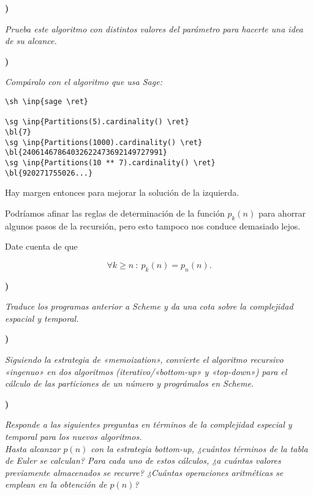 \documentclass{article}
\newcommand\ret{↵\ } %
\newcommand\inp[1]{\colorbox{gray!40}{#1}} %
\newcounter{pregunta}
\newcommand\prop[1]%
{\addtocounter{pregunta}{1}
\noindent%
{\color{naranja_muy}\small\bf\thepregunta)}
\parbox[t]{.95\linewidth}{\it #1}}
\newcommand\cod{./scripts}
\def\sh{{\color{naranja_muy}\texttt{\$}}\hspace{-1em} }
\def\sg{{\color{naranja_muy}\texttt{sage:}}}
\def\bl#1{{\color{black!50!blue}\texttt{#1}}}
\begin{document}
\hfill
\begin{minipage}[t]{7cm}
\prop%
{Prueba este algoritmo con distintos valores del parámetro
  para hacerte una idea de su alcance.}
\vspace{5mm}

\prop%
{Compáralo con el algoritmo que usa Sage:}

\begin{Verbatim}[commandchars=\\\{\}]
\sh \inp{sage \ret}

\sg \inp{Partitions(5).cardinality() \ret}
\bl{7}
\sg \inp{Partitions(1000).cardinality() \ret}
\bl{24061467864032622473692149727991}
\sg \inp{Partitions(10 ** 7).cardinality() \ret}
\bl{920271755026...}
\end{Verbatim}

Hay margen entonces para mejorar la solución de la
izquierda.
\end{minipage}

\begin{minipage}[t]{6cm}
Podríamos afinar las reglas de determinación de la función
$p_k(n)$ para ahorrar algunos pasos de la recursión, pero
esto tampoco nos conduce demasiado lejos.
\vspace{1cm}

Date cuenta de que

\[\forall k\geq n\ :\ p_k(n) = p_n(n).\]
\end{minipage}
\hfill
\begin{minipage}[t]{8cm}
\VerbatimInput%
[frame=lines,framesep=2mm]%
{\cod/cod_03_02_v3_add.py}
\end{minipage}
\vspace{5mm}

\prop%
    {
      Traduce los programas anterior a Scheme y da una cota sobre la complejidad espacial y temporal.
    }
    
\prop%
{Siguiendo la estrategia de «memoization», convierte
  el algoritmo recursivo «ingenuo» en dos algoritmos
  (\emph{iterativo/«bottom-up»} y \emph{«top-down»}) para el cálculo de
  las particiones de un número y prográmalos en Scheme.}

\prop%
{Responde a las siguientes preguntas en términos de la complejidad especial y temporal para los nuevos algoritmos.\\[-3mm]

Hasta alcanzar $p(n)$ con la estrategia \emph{bottom-up},
¿cuántos términos de la tabla de Euler se calculan?  Para
cada uno de estos cálculos, ¿a cuántas valores previamente
almacenados se recurre? ¿Cuántas operaciones aritméticas se
emplean en la obtención de $p(n)$?}
\end{document}
